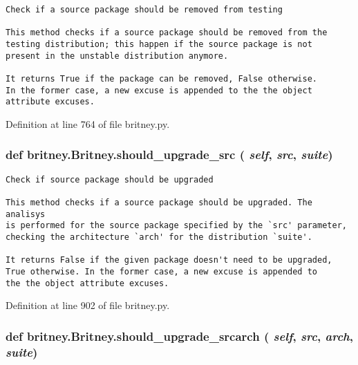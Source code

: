 \footnotesize\begin{verbatim}Check if a source package should be removed from testing

This method checks if a source package should be removed from the
testing distribution; this happen if the source package is not
present in the unstable distribution anymore.

It returns True if the package can be removed, False otherwise.
In the former case, a new excuse is appended to the the object
attribute excuses.
\end{verbatim}
\normalsize
 

Definition at line 764 of file britney.py.
\subsubsection{\setlength{\rightskip}{0pt plus 5cm}def britney.Britney.should\_\-upgrade\_\-src ( {\em self},  {\em src},  {\em suite})}\label{classbritney_1_1Britney_94785175a85f44b1afaf3add167a211f}




\footnotesize\begin{verbatim}Check if source package should be upgraded

This method checks if a source package should be upgraded. The analisys
is performed for the source package specified by the `src' parameter, 
checking the architecture `arch' for the distribution `suite'.
       
It returns False if the given package doesn't need to be upgraded,
True otherwise. In the former case, a new excuse is appended to
the the object attribute excuses.
\end{verbatim}
\normalsize
 

Definition at line 902 of file britney.py.
\subsubsection{\setlength{\rightskip}{0pt plus 5cm}def britney.Britney.should\_\-upgrade\_\-srcarch ( {\em self},  {\em src},  {\em arch},  {\em suite})}\label{classbritney_1_1Britney_bd18d7acde434387e94344a39db5b0e5}




